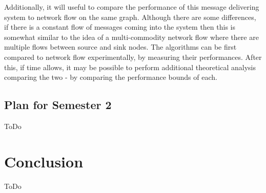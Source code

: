 \documentclass[bsc,frontabs,twoside,singlespacing,parskip,deptreport]{infthesis}     %
\begin{document}
Additionally, it will useful to compare the performance of this message delivering system to network flow on the same graph. Although there are some differences, if there is a constant flow of messages coming into the system then this is somewhat similar to the idea of a multi-commodity network flow where there are multiple flows between source and sink nodes. The algorithms can be first compared to network flow experimentally, by measuring their performances. After this, if time allows, it may be possible to perform additional theoretical analysis comparing the two - by comparing the performance bounds of each.


\section{Plan for Semester 2}
ToDo
\chapter{Conclusion}
ToDo



\end{document}
